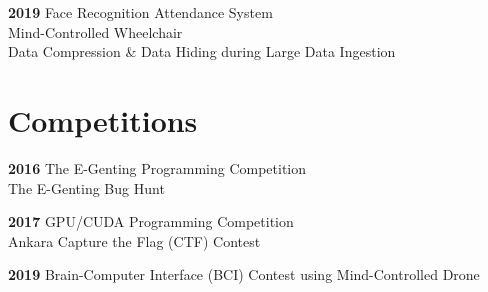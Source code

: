 \documentclass[English]{cv-style}
\begin{document}
\textbf{2019}
    \vspace{0.1mm} {\quad \quad Face Recognition Attendance System} \\
    \vspace{0.1mm} {\quad \quad \quad \quad Mind-Controlled Wheelchair} \\
    \vspace{0.1mm} {\quad \quad \quad \quad Data Compression \& Data Hiding during Large Data Ingestion} 
\section{Competitions}
\vspace{-0.2cm}
\textbf{2016}   
    \vspace{0.1mm} {\quad \quad The E-Genting Programming Competition} \\
    \vspace{0.1mm} {\quad \quad \quad \quad The E-Genting Bug Hunt}
    
\textbf{2017}
    \vspace{0.1mm} {\quad \quad GPU/CUDA Programming Competition} \\
    \vspace{0.1mm} {\quad \quad \quad \quad Ankara Capture the Flag (CTF) Contest}
    
\textbf{2019}
    \vspace{0.1mm} {\quad \quad Brain-Computer Interface (BCI) Contest using Mind-Controlled Drone} 
\end{document}
